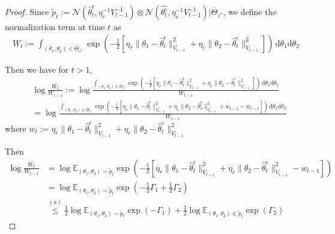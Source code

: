 \documentclass[accepted]{uai2025} %
\theoremstyle{plain}
\theoremstyle{definition}
\theoremstyle{remark}
\newcommand{\thetac}{\theta^{\mathrm{c}}}
\newcommand{\EE}{\mathbb{E}} %
\begin{document}
\begin{proof}
    Since $\tilde{p}_t := \mathcal{N}(\hat{\theta}^{\mathrm{r}}_t, \eta_r^{-1} V_{t-1}^{-1}) \otimes\mathcal{N}(\hat{\thetac_t}, \eta_c^{-1} V_{t-1}^{-1} ) | \overline{\Theta}_{z^*}$, we define the normalization term at time $t$ as 
    \begin{align*}
        W_t:=\int_{(\theta_1, \theta_2) \in \overline{\Theta}_{z^*}}\exp\left(-\frac{1}{2}\left[\eta_r\lVert\theta_1-\hat{\theta}_t^\mathrm{r}\rVert^2_{V_{t-1}}+\eta_c\lVert\theta_2-\hat{\theta}_t^\mathrm{c}\rVert^2_{V_{t-1}}\right]\right) \,\mathrm{d}\theta_1 \mathrm{d}\theta_2
    \end{align*}

Then we have for $t>1$,
\begin{align*}
    &\log \frac{W_{t}}{W_{t-1}}:=\log \frac{\int_{(\theta_1, \theta_2) \in \overline{\Theta}_{z^*}}\exp\left(-\frac{1}{2}\left[\eta_r\lVert\theta_1-\hat{\theta}_{t}^\mathrm{r}\rVert^2_{V_{t-1}}+\eta_c\lVert\theta_2-\hat{\theta}_{t}^\mathrm{c}\rVert^2_{V_{t-1}}\right]\right) \,\mathrm{d}\theta_1 \mathrm{d}\theta_2}{W_{t-1}}
    \\&=\log \frac{\int_{(\theta_1, \theta_2) \in \overline{\Theta}_{z^*}}\exp\left(-\frac{1}{2}\left[\eta_r\lVert\theta_1-\hat{\theta}_{t}^\mathrm{r}\rVert^2_{V_{t-1}} +\eta_c\lVert\theta_2-\hat{\theta}_{t}^\mathrm{c}\rVert^2_{V_{t-1}}+w_{t-1}-w_{t-1}\right]\right) \,\mathrm{d}\theta_1 \mathrm{d}\theta_2}{W_{t-1}}
\end{align*}
where $w_t:=\eta_r\lVert\theta_1-\hat{\theta}_t^\mathrm{r}\rVert^2_{V_{t-1}}+\eta_c\lVert\theta_2-\hat{\theta}_t^\mathrm{c}\rVert^2_{V_{t-1}}$

Then
\begin{align*}
    \log \frac{W_{t}}{W_{t-1}}&=\log {\EE_{(\theta_1, \theta_2) \sim\tilde{p}_t}\exp\left(-\frac{1}{2}\left[\eta_r\lVert\theta_1-\hat{\theta}_{t}^\mathrm{r}\rVert^2_{V_{t-1}} +\eta_c\lVert\theta_2-\hat{\theta}_{t}^\mathrm{c}\rVert^2_{V_{t-1}}-w_{t-1}\right]\right) }
    \\&=\log \EE_{(\theta_1, \theta_2)\sim \tilde{p}_t}\exp \left(-\frac{1}{2}\Gamma_1+\frac{1}{2}\Gamma_2\right)
    \\&\stackrel{(a)}{\le}\frac{1}{2}\log \EE_{(\theta_1, \theta_2)\sim\tilde{p}_t}\exp \left(-\Gamma_1\right)+\frac{1}{2}\log \EE_{(\theta_1, \theta_2) \in \tilde{p}_t}\exp \left(\Gamma_2\right)
\end{align*}


\end{proof}
\end{document}
